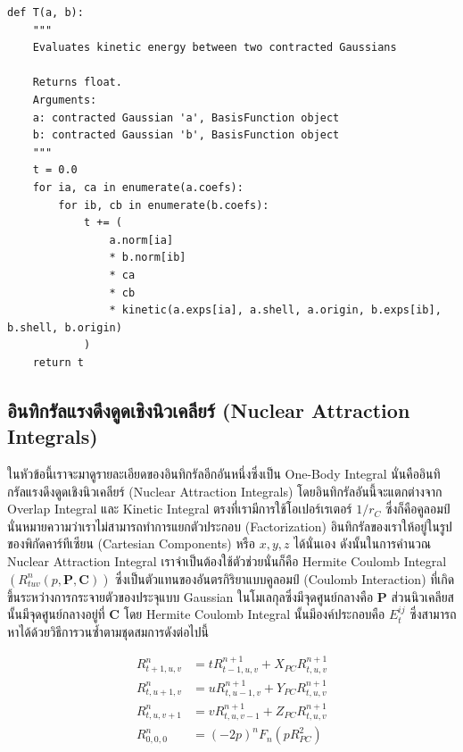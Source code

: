 \begin{lstlisting}[style=MyPython]
def T(a, b):
    """
    Evaluates kinetic energy between two contracted Gaussians

    Returns float.
    Arguments:
    a: contracted Gaussian 'a', BasisFunction object
    b: contracted Gaussian 'b', BasisFunction object
    """
    t = 0.0
    for ia, ca in enumerate(a.coefs):
        for ib, cb in enumerate(b.coefs):
            t += (
                a.norm[ia]
                * b.norm[ib]
                * ca
                * cb
                * kinetic(a.exps[ia], a.shell, a.origin, b.exps[ib], b.shell, b.origin)
            )
    return t
\end{lstlisting}

\subsection{อินทิกรัลแรงดึงดูดเชิงนิวเคลียร์ (Nuclear Attraction Integrals)}

ในหัวข้อนี้เราจะมาดูรายละเอียดของอินทิกรัลอีกอันหนึ่งซึ่งเป็น One-Body Integral นั่นคืออินทิกรัลแรงดึงดูดเชิงนิวเคลียร์ (Nuclear Attraction
Integrals) โดยอินทิกรัลอันนี้จะแตกต่างจาก Overlap Integral และ Kinetic Integral ตรงที่เรามีการใช้โอเปอร์เรเตอร์ $1/r_C$
ซึ่งก็คือคูลอมป์ นั่นหมายความว่าเราไม่สามารถทำการแยกตัวประกอบ (Factorization) อินทิกรัลของเราให้อยู่ในรูปของพิกัดคาร์ทีเซียน 
(Cartesian Components) หรือ $x,y,z$ ได้นั่นเอง ดังนั้นในการคำนวณ Nuclear Attraction Integral เราจำเป็นต้องใช้ตัวช่วยนั่นก็คือ
Hermite Coulomb Integral $(R^n_{tuv}(p,\mathbf{P},\mathbf{C}))$ ซึ่งเป็นตัวแทนของอันตรกิริยาแบบคูลอมป์ (Coulomb Interaction) 
ที่เกิดขึ้นระหว่างการกระจายตัวของประจุแบบ Gaussian ในโมเลกุลซึ่งมีจุดศูนย์กลางคือ $\mathbf{P}$ ส่วนนิวเคลียสนั้นมีจุดศูนย์กลางอยู่ที่ 
$\mathbf{C}$ โดย Hermite Coulomb Integral นั้นมีองค์ประกอบคือ $E_t^{ij}$ ซึ่งสามารถหาได้ด้วยวิธีการวนซ้ำตามชุดสมการดังต่อไปนี้

\begin{align}
  R^{n}_{t+1,u,v} & = t R^{n+1}_{t-1,u,v} + X_{PC}R^{n+1}_{t,u,v} \\
  R^{n}_{t,u+1,v} & = u R^{n+1}_{t,u-1,v} + Y_{PC}R^{n+1}_{t,u,v} \\
  R^{n}_{t,u,v+1} & = v R^{n+1}_{t,u,v-1} + Z_{PC}R^{n+1}_{t,u,v} \\
  R^{n}_{0,0,0}   & = (-2p)^n F_n (p R_{PC}^2)
\end{align}

